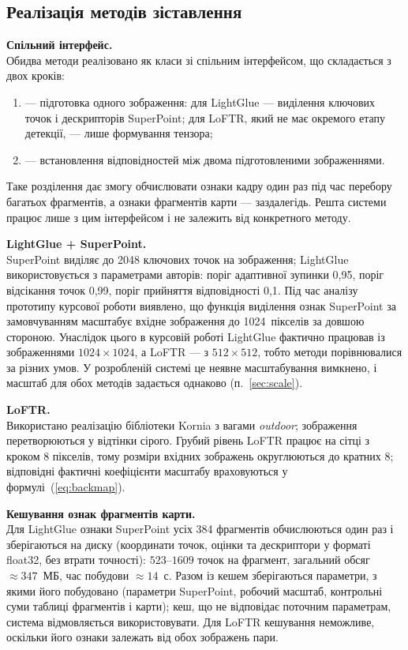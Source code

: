 \subsection{Реалізація методів зіставлення}

\textbf{Спільний інтерфейс.}\\
Обидва методи реалізовано як класи зі спільним інтерфейсом, що складається з двох кроків:
\begin{enumerate}
    \item {} --- підготовка одного зображення: для LightGlue --- виділення ключових точок і дескрипторів SuperPoint; для LoFTR, який не має окремого етапу детекції, --- лише формування тензора;
    \item {} --- встановлення відповідностей між двома підготовленими зображеннями.
\end{enumerate}
Таке розділення дає змогу обчислювати ознаки кадру один раз під час перебору багатьох фрагментів, а ознаки фрагментів карти --- заздалегідь. Решта системи працює лише з цим інтерфейсом і не залежить від конкретного методу.

\textbf{LightGlue + SuperPoint.}\\
SuperPoint виділяє до 2048 ключових точок на зображення; LightGlue використовується з параметрами авторів: поріг адаптивної зупинки 0,95, поріг відсікання точок 0,99, поріг прийняття відповідності 0,1. Під час аналізу прототипу курсової роботи виявлено, що функція виділення ознак SuperPoint за замовчуванням масштабує вхідне зображення до 1024~пікселів за довшою стороною. Унаслідок цього в курсовій роботі LightGlue фактично працював із зображеннями $1024 \times 1024$, а LoFTR --- з $512 \times 512$, тобто методи порівнювалися за різних умов. У розробленій системі це неявне масштабування вимкнено, і масштаб для обох методів задається однаково (п.~\ref{sec:scale}).

\textbf{LoFTR.}\\
Використано реалізацію бібліотеки Kornia з вагами \textit{outdoor}; зображення перетворюються у відтінки сірого. Грубий рівень LoFTR працює на сітці з кроком 8 пікселів, тому розміри вхідних зображень округлюються до кратних 8; відповідні фактичні коефіцієнти масштабу враховуються у формулі~(\ref{eq:backmap}).

\textbf{Кешування ознак фрагментів карти.}\\
Для LightGlue ознаки SuperPoint усіх 384 фрагментів обчислюються один раз і зберігаються на диску (координати точок, оцінки та дескриптори у форматі float32, без втрати точності): $523$--$1609$ точок на фрагмент, загальний обсяг $\approx 347$~МБ, час побудови $\approx 14$~с. Разом із кешем зберігаються параметри, з якими його побудовано (параметри SuperPoint, робочий масштаб, контрольні суми таблиці фрагментів і карти); кеш, що не відповідає поточним параметрам, система відмовляється використовувати. Для LoFTR кешування неможливе, оскільки його ознаки залежать від обох зображень пари.

